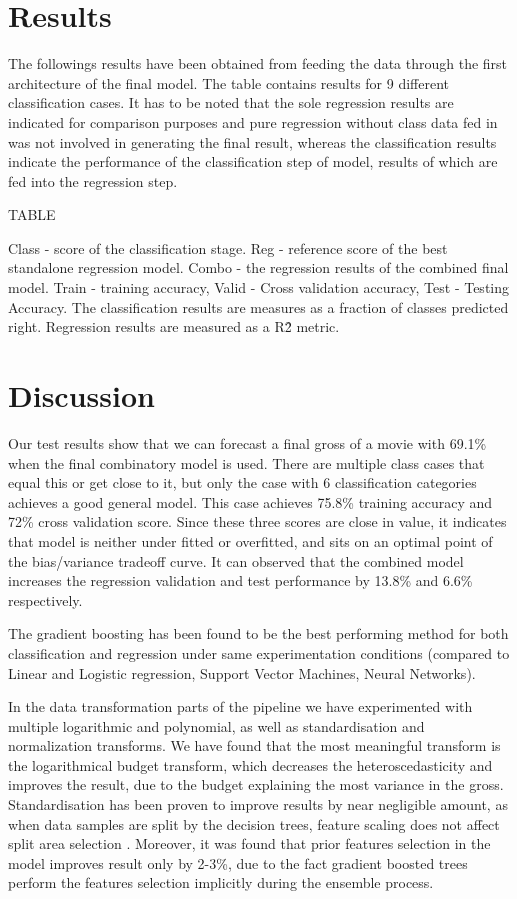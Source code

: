 \section{Results}
The followings results have been obtained from feeding the data through the first architecture of the final model. The table contains results for 9 different classification cases. It has to be noted that the sole regression results are indicated for comparison purposes and pure regression without class data fed in was not involved in generating the final result, whereas the classification results indicate the performance of the classification step of model, results of which are fed into the regression step.


TABLE


Class - score of the classification stage. Reg - reference score of the best standalone regression model. Combo - the regression results of the combined final model. Train - training accuracy, Valid - Cross validation accuracy, Test - Testing Accuracy. The classification results are measures as a fraction of classes predicted right. Regression results are measured as a R\^2 metric. 


\section{Discussion}
Our test results show that we can forecast a final gross of a movie with 69.1\%  when the final combinatory model is used. There are multiple class cases that equal this or get close to it, but only the case with 6 classification categories achieves a good general model. This case achieves 75.8\% training accuracy and 72\% cross validation score. Since these three scores are close in value, it indicates that model is neither under fitted or overfitted, and sits on an optimal point of the bias/variance tradeoff curve. It can observed that the combined model increases the regression validation and test performance by 13.8\%  and 6.6\% respectively. 

The gradient boosting has been found to be the best performing method for both classification and regression under same experimentation conditions (compared to Linear and Logistic regression, Support Vector Machines, Neural Networks). 

In the data transformation parts of the pipeline we have experimented with multiple logarithmic and polynomial, as well as standardisation and  normalization transforms. We have found that the most meaningful transform  is the logarithmical budget transform, which decreases the heteroscedasticity and improves the result, due to the budget explaining the most variance in the gross. Standardisation has been proven to improve results by near negligible  amount, as when data samples are split by the decision trees, feature scaling does not affect split area selection \cite{chen2014introduction}. Moreover, it was found that prior features selection in the model improves result only by  2-3\%, due to the fact gradient boosted trees perform the features selection implicitly during the ensemble process. 


